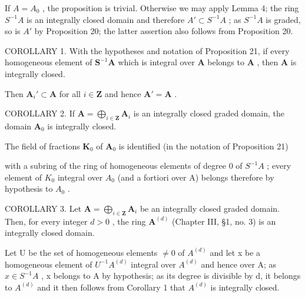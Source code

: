 If \(A = A_{0}\) , the proposition is trivial. Otherwise we may apply Lemma 4; the ring \(S^{-1}A\) is an integrally closed domain and therefore \(A' \subset S^{-1}A\) ; as \(S^{-1}A\) is graded, so is \(A'\) by Proposition 20; the latter assertion also follows from Proposition 20.

COROLLARY 1. With the hypotheses and notation of Proposition 21, if every homogeneous element of \(\mathbf{S}^{-1}\mathbf{A}\) which is integral over \(\mathbf{A}\) belongs to \(\mathbf{A}\) , then \(\mathbf{A}\) is integrally closed.

Then \(\mathbf{A}_i' \subset \mathbf{A}\) for all \(i \in \mathbf{Z}\) and hence \(\mathbf{A}' = \mathbf{A}\) .

COROLLARY 2. If \(\mathbf{A} = \bigoplus_{i\in \mathbf{Z}}\mathbf{A}_i\) is an integrally closed graded domain, the domain \(\mathbf{A}_0\) is integrally closed.

The field of fractions \(\mathbf{K}_0\) of \(\mathbf{A}_0\) is identified (in the notation of Proposition 21)

with a subring of the ring of homogeneous elements of degree 0 of \(S^{-1}A\) ; every element of \(K_{0}\) integral over \(A_{0}\) (and a fortiori over A) belongs therefore by hypothesis to \(A_{0}\) .

COROLLARY 3. Let \(\mathbf{A} = \bigoplus_{i\in \mathbf{Z}}\mathbf{A}_i\) be an integrally closed graded domain. Then, for every integer \(d > 0\) , the ring \(\mathbf{A}^{(d)}\) (Chapter III, §1, no. 3) is an integrally closed domain.

Let U be the set of homogeneous elements \(\neq0\) of \(A^{(d)}\) and let x be a homogeneous element of \(U^{-1}A^{(d)}\) integral over \(A^{(d)}\) and hence over A; as \(x\in S^{-1}A\) , x belongs to A by hypothesis; as its degree is divisible by d, it belongs to \(A^{(d)}\) and it then follows from Corollary 1 that \(A^{(d)}\) is integrally closed.


